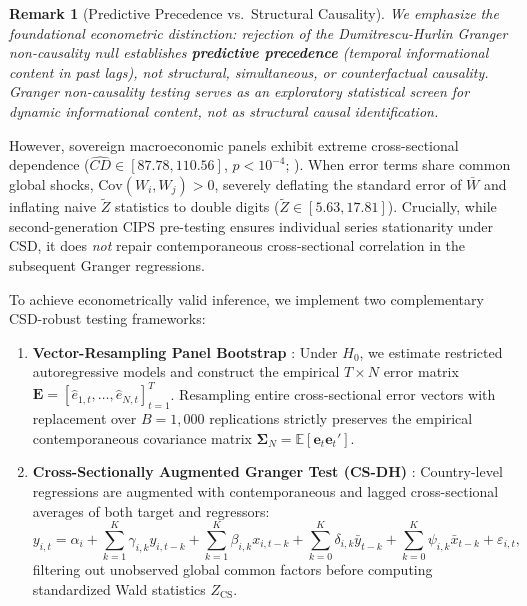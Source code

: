 \documentclass[11pt,a4paper]{article}
\newtheorem{remark}{Remark}
\begin{document}
\begin{remark}[Predictive Precedence vs.\ Structural Causality]
We emphasize the foundational econometric distinction: rejection of the Dumitrescu-Hurlin Granger non-causality null establishes \textbf{predictive precedence} (temporal informational content in past lags), not structural, simultaneous, or counterfactual causality. Granger non-causality testing serves as an exploratory statistical screen for dynamic informational content, not as structural causal identification.
\end{remark}

However, sovereign macroeconomic panels exhibit extreme cross-sectional dependence ($\hat{CD} \in [87.78, 110.56]$, $p < 10^{-4}$; \citealt{pesaran2021cd}). When error terms share common global shocks, $\text{Cov}(W_i, W_j) > 0$, severely deflating the standard error of $\bar{W}$ and inflating naive $\tilde{Z}$ statistics to double digits ($\tilde{Z} \in [5.63, 17.81]$). Crucially, while second-generation CIPS pre-testing ensures individual series stationarity under CSD, it does \emph{not} repair contemporaneous cross-sectional correlation in the subsequent Granger regressions.

To achieve econometrically valid inference, we implement two complementary CSD-robust testing frameworks:
\begin{enumerate}[leftmargin=*, label=(\roman*)]
    \item \textbf{Vector-Resampling Panel Bootstrap} \citep{emirmahmutoglu2011, lopez2017}: Under $H_0$, we estimate restricted autoregressive models and construct the empirical $T \times N$ error matrix $\mathbf{E} = [\hat{e}_{1,t}, \dots, \hat{e}_{N,t}]_{t=1}^T$. Resampling entire cross-sectional error vectors with replacement over $B=1{,}000$ replications strictly preserves the empirical contemporaneous covariance matrix $\boldsymbol{\Sigma}_N = \mathbb{E}[\mathbf{e}_t \mathbf{e}_t']$.
    \item \textbf{Cross-Sectionally Augmented Granger Test (CS-DH)} \citep{chudik2015, chudik2016}: Country-level regressions are augmented with contemporaneous and lagged cross-sectional averages of both target and regressors:
    \begin{equation}
    y_{i,t} = \alpha_i + \sum_{k=1}^K \gamma_{i,k} y_{i,t-k} + \sum_{k=1}^K \beta_{i,k} x_{i,t-k} + \sum_{k=0}^K \delta_{i,k} \bar{y}_{t-k} + \sum_{k=0}^K \psi_{i,k} \bar{x}_{t-k} + \varepsilon_{i,t},
    \end{equation}
    filtering out unobserved global common factors before computing standardized Wald statistics $Z_{\text{CS}}$.
\end{enumerate}
\end{document}
